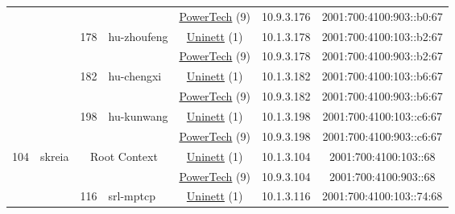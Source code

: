 \begin{small}
\begin{center}
\begin{longtable}{|c|c|c|c|c|c|c|c|}
  &  &  &  & \multicolumn{2}{|c|}{\tiny{\href{http://www.powertech.no}{PowerTech} (9)}} & \tiny{10.9.3.176} & \tiny{2001:700:4100:903::b0:67} \\* \cline{3-3}\cline{4-4}\cline{5-5}\cline{6-6}\cline{7-7}\cline{8-8}
  &  & \multirow{2}{*}{\tiny{178}} & \multicolumn{1}{|l|}{\multirow{2}{*}{\tiny{hu-zhoufeng}}} & \multicolumn{2}{|c|}{\tiny{\href{https://www.uninett.no}{Uninett} (1)}} & \tiny{10.1.3.178} & \tiny{2001:700:4100:103::b2:67} \\* \cline{5-5}\cline{6-6}\cline{7-7}\cline{8-8}
  &  &  &  & \multicolumn{2}{|c|}{\tiny{\href{http://www.powertech.no}{PowerTech} (9)}} & \tiny{10.9.3.178} & \tiny{2001:700:4100:903::b2:67} \\* \cline{3-3}\cline{4-4}\cline{5-5}\cline{6-6}\cline{7-7}\cline{8-8}
  &  & \multirow{2}{*}{\tiny{182}} & \multicolumn{1}{|l|}{\multirow{2}{*}{\tiny{hu-chengxi}}} & \multicolumn{2}{|c|}{\tiny{\href{https://www.uninett.no}{Uninett} (1)}} & \tiny{10.1.3.182} & \tiny{2001:700:4100:103::b6:67} \\* \cline{5-5}\cline{6-6}\cline{7-7}\cline{8-8}
  &  &  &  & \multicolumn{2}{|c|}{\tiny{\href{http://www.powertech.no}{PowerTech} (9)}} & \tiny{10.9.3.182} & \tiny{2001:700:4100:903::b6:67} \\* \cline{3-3}\cline{4-4}\cline{5-5}\cline{6-6}\cline{7-7}\cline{8-8}
  &  & \multirow{2}{*}{\tiny{198}} & \multicolumn{1}{|l|}{\multirow{2}{*}{\tiny{hu-kunwang}}} & \multicolumn{2}{|c|}{\tiny{\href{https://www.uninett.no}{Uninett} (1)}} & \tiny{10.1.3.198} & \tiny{2001:700:4100:103::c6:67} \\* \cline{5-5}\cline{6-6}\cline{7-7}\cline{8-8}
  &  &  &  & \multicolumn{2}{|c|}{\tiny{\href{http://www.powertech.no}{PowerTech} (9)}} & \tiny{10.9.3.198} & \tiny{2001:700:4100:903::c6:67} \\ \hline
 \multirow{38}{*}{\tiny{104}} & \multicolumn{1}{|l|}{\multirow{38}{*}{\tiny{skreia}}} & \multicolumn{2}{|c|}{\multirow{2}{*}{\tiny{Root Context}}} & \multicolumn{2}{|c|}{\tiny{\href{https://www.uninett.no}{Uninett} (1)}} & \tiny{10.1.3.104} & \tiny{2001:700:4100:103::68} \\* \cline{5-5}\cline{6-6}\cline{7-7}\cline{8-8}
  &  & \multicolumn{2}{|c|}{} & \multicolumn{2}{|c|}{\tiny{\href{http://www.powertech.no}{PowerTech} (9)}} & \tiny{10.9.3.104} & \tiny{2001:700:4100:903::68} \\* \cline{3-3}\cline{4-4}\cline{5-5}\cline{6-6}\cline{7-7}\cline{8-8}
  &  & \multirow{2}{*}{\tiny{116}} & \multicolumn{1}{|l|}{\multirow{2}{*}{\tiny{srl-mptcp}}} & \multicolumn{2}{|c|}{\tiny{\href{https://www.uninett.no}{Uninett} (1)}} & \tiny{10.1.3.116} & \tiny{2001:700:4100:103::74:68} \\* \cline{5-5}\cline{6-6}\cline{7-7}\cline{8-8}

\end{longtable}
\end{center}
\end{small}
